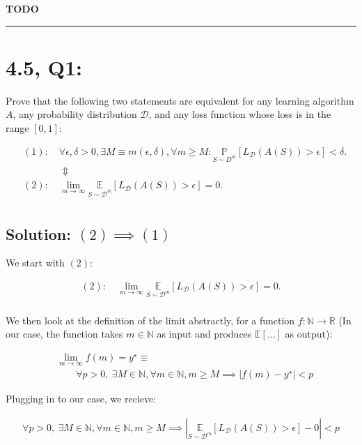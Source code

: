 \documentclass[11pt]{article}
\newcommand{\D}{\ensuremath{\mathcal{D}}}
\begin{document}
\textbf{TODO}


\rule{\textwidth}{1pt}

\section*{4.5, Q1:}
Prove that the following two statements are equivalent for any learning
algorithm $A$, any probability distribution $\D$, and any loss function
whose loss is in the range $[0, 1]$:

\begin{align*}
    &(1): \quad \forall \epsilon, \delta > 0, \exists M \equiv m(\epsilon, \delta), \forall m \geq M :
    \underset{S \sim D^m }{\mathbb P}[L_\D(A(S)) > \epsilon] < \delta. \\
    & \qquad \qquad \Updownarrow \\
    &(2): \quad \lim_{m \rightarrow \infty} \underset{S \sim \D^m }{\mathbb E}[L_\D(A(S)) > \epsilon] = 0. \\
\end{align*}


\subsection*{Solution: $(2) \implies (1)$ }
We start with $(2)$:

\begin{align*}
    (2): ~ &\lim_{m \rightarrow \infty} \underset{S \sim \D^m }{\mathbb E}[L_\D(A(S)) > \epsilon] = 0. \\
\end{align*}

We then look at the definition of the limit abstractly, for a function $f: \mathbb N \rightarrow \mathbb R$
(In our case, the function takes $m\in \mathbb N$ as input and produces $\mathbb E[\dots]$ as output):

\begin{align*}
&\lim_{m \rightarrow \infty} f(m) = y^\star \equiv \\
    &\qquad 
    \forall p > 0, ~ \exists M \in \mathbb N,
    \forall m \in \mathbb N, m \geq M \implies 
    |f(m) - y^\star| < p
\end{align*}

Plugging in to our case, we recieve:

\begin{align*}
    \forall p > 0, ~ \exists M \in \mathbb N, 
    \forall m \in \mathbb N, m \geq M \implies 
    \left|\underset{S \sim \D^m }{\mathbb E}[L_\D(A(S)) > \epsilon]  - 0\right| < p
\end{align*}
\end{document}

